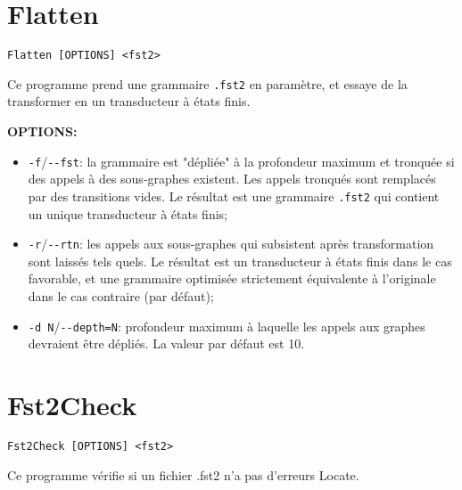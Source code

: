 \section{Flatten}
\verb+Flatten [OPTIONS] <fst2>+

\bigskip
\noindent Ce programme prend une grammaire \verb+.fst2+ en paramètre, et essaye de la transformer
en un transducteur à états finis.


\bigskip
\noindent \textbf{OPTIONS:}
\begin{itemize}
\item \verb+-f+/\verb+--fst+: la grammaire est "dépliée" à la profondeur maximum et tronquée si des
	appels à des sous-graphes existent. Les appels tronqués sont remplacés par des transitions
	vides. Le résultat est une grammaire \verb+.fst2+ qui contient un unique transducteur à
	états finis;

\item \verb+-r+/\verb+--rtn+: les appels aux sous-graphes qui subsistent après transformation sont
	laissés tels quels. Le résultat est un transducteur à états finis dans le cas favorable, et
	une grammaire optimisée strictement équivalente à l'originale dans le cas contraire (par
		défaut);

\item \verb+-d N+/\verb+--depth=N+: profondeur maximum à laquelle les appels aux graphes devraient
	être dépliés. La valeur par défaut est 10.
\end{itemize}







\section{Fst2Check}
\verb+Fst2Check [OPTIONS] <fst2>+

\bigskip
\noindent Ce programme vérifie si un fichier .fst2 n'a pas d'erreurs Locate.

